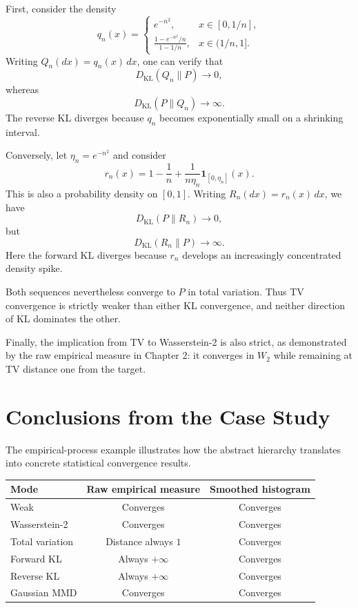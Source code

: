 \documentclass[
  11pt,
  a4paper,
  notitlepage
]{report}
\begin{document}
First, consider the density
\[
q_n(x)=
\begin{cases}
e^{-n^2}, & x\in[0,1/n],\\[3pt]
\displaystyle
\frac{1-e^{-n^2}/n}{1-1/n},
& x\in(1/n,1].
\end{cases}
\]
Writing $Q_n(dx)=q_n(x)\,dx$, one can verify that
\[
D_{\mathrm{KL}}(Q_n\|P)\to0,
\]
whereas
\[
D_{\mathrm{KL}}(P\|Q_n)\to\infty.
\]
The reverse KL diverges because $q_n$ becomes
exponentially small on a shrinking interval.

Conversely, let $\eta_n=e^{-n^2}$ and consider
\[
r_n(x)
=
1-\frac1n+
\frac{1}{n\eta_n}
\mathbf1_{[0,\eta_n]}(x).
\]
This is also a probability density on $[0,1]$.
Writing $R_n(dx)=r_n(x)\,dx$, we have
\[
D_{\mathrm{KL}}(P\|R_n)\to0,
\]
but
\[
D_{\mathrm{KL}}(R_n\|P)\to\infty.
\]
Here the forward KL diverges because $r_n$
develops an increasingly concentrated density spike.

Both sequences nevertheless converge to $P$ in
total variation. Thus TV convergence is strictly
weaker than either KL convergence, and neither
direction of KL dominates the other.

Finally, the implication from TV to Wasserstein-2
is also strict, as demonstrated by the raw empirical
measure in Chapter 2: it converges in $W_2$ while
remaining at TV distance one from the target.

\section{Conclusions from the Case Study}
\label{conclusions-from-the-case-study}

The empirical-process example illustrates how the
abstract hierarchy translates into concrete
statistical convergence results.

\begin{center}
\small
\renewcommand{\arraystretch}{1.2}
\begin{tabular}{@{}lcc@{}}
\toprule
Mode
& Raw empirical measure
& Smoothed histogram\\
\midrule
Weak
& Converges & Converges\\
Wasserstein-2
& Converges & Converges\\
Total variation
& Distance always $1$ & Converges\\
Forward KL
& Always $+\infty$ & Converges\\
Reverse KL
& Always $+\infty$ & Converges\\
Gaussian MMD
& Converges & Converges\\
\bottomrule
\end{tabular}
\end{center}
\end{document}
